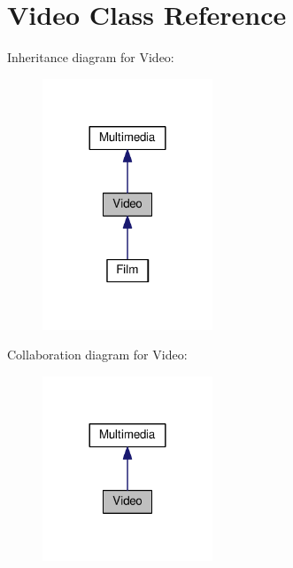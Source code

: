 \hypertarget{classVideo}{\section{Video Class Reference}
\label{classVideo}
}


Inheritance diagram for Video\+:
\nopagebreak
\begin{figure}[H]
\begin{center}
\leavevmode
\includegraphics[width=144pt]{classVideo__inherit__graph}
\end{center}
\end{figure}


Collaboration diagram for Video\+:
\nopagebreak
\begin{figure}[H]
\begin{center}
\leavevmode
\includegraphics[width=144pt]{classVideo__coll__graph}
\end{center}
\end{figure}
